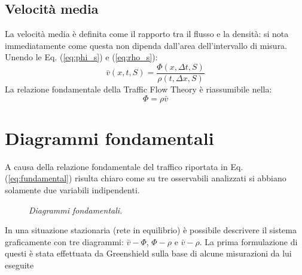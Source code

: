 \documentclass[../main.tex]{subfiles}
\begin{document}
\subsection{Velocit\`a media}
La velocit\`a media \`e definita come il rapporto tra il flusso e la densit\`a: si nota immediatamente come questa non dipenda dall'area dell'intervallo di misura.
Unendo le Eq. (\ref{eq:phi_s}) e (\ref{eq:rho_s}):
\begin{equation}
    \bar{v}(x, t, S)=\frac{\Phi(x, \Delta t, S)}{\rho(t,\Delta x, S)}
\end{equation}
La relazione fondamentale della Traffic Flow Theory \cite{H111} \`e riassumibile nella:
\begin{equation}
    \Phi=\rho\bar{v}
    \label{eq:fundamental}
\end{equation}

\section{Diagrammi fondamentali}
A causa della relazione fondamentale del traffico riportata in Eq. (\ref{eq:fundamental}) risulta chiaro come su tre osservabili analizzati si abbiano solamente due variabili indipendenti.
\begin{figure}[H]
\centering
{}
\caption[Diagrammi fondamentali]{\emph{Diagrammi fondamentali.}}
\end{figure}
In una situazione stazionaria (rete in equilibrio) \`e possibile descrivere il sistema graficamente con tre diagrammi: $\bar{v}-\Phi$, $\Phi-\rho$ e $\bar{v}-\rho$.
La prima formulazione di questi \`e stata effettuata da Greenshield sulla base di alcune misurazioni da lui eseguite
\end{document}
